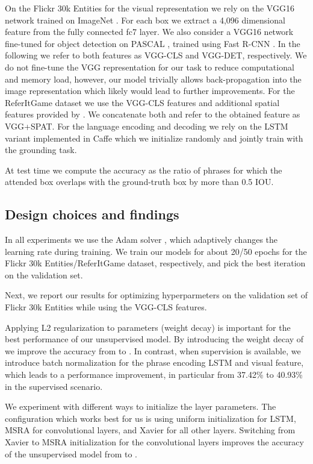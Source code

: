 On the Flickr 30k Entities for the visual representation we rely on the VGG16 network \cite{simonyan2014very} trained on ImageNet \cite{deng09cvpr}. For each box we extract a 4,096 dimensional feature from the fully connected fc7 layer. We also consider a VGG16 network fine-tuned for object detection on PASCAL \cite{everingham2010pascal}, trained using Fast R-CNN \cite{girshick2015fast}. In the following we refer to both features as VGG-CLS and VGG-DET, respectively. We do not fine-tune the VGG representation for our task to reduce computational and memory load, however, our model trivially allows back-propagation into the image representation which likely would lead to further improvements. For the ReferItGame dataset we use the VGG-CLS features and additional spatial features provided by \cite{hu16cvpr}. We concatenate both and refer to the obtained feature as VGG+SPAT. For the language encoding and decoding we rely on the LSTM variant implemented in Caffe \cite{jia2014caffe} which we initialize randomly and jointly train with the grounding task.

At test time we compute the accuracy as the ratio of phrases for which the attended box overlaps with the ground-truth box by more than 0.5 IOU.
 
\subsection{Design choices and findings}

In all experiments we use the Adam solver \cite{kingma2014adam}, which adaptively changes the learning rate during training. We train our models for about 20/50 epochs for the Flickr 30k Entities/ReferItGame dataset, respectively, and pick the best iteration on the validation set. 

Next, we report our results for optimizing hyperparmeters on the validation set of Flickr 30k Entities while using the VGG-CLS features.

Applying L2 regularization to parameters (weight decay) is important for the best performance of our unsupervised model. By introducing the weight decay of  we improve the accuracy from  to . In contrast, when supervision is available, we introduce batch normalization \cite{ioffe2015batch} for the phrase encoding LSTM and visual feature, which leads to a performance improvement, in particular from 37.42\% to 40.93\% in the supervised scenario.

We experiment with different ways to initialize the layer parameters. The configuration which works best for us is using uniform initialization for LSTM, MSRA \cite{he2015delving} for convolutional layers, and Xavier \cite{glorot2010understanding} for all other layers. Switching from Xavier to MSRA initialization for the convolutional layers improves the accuracy of the unsupervised model from  to .






